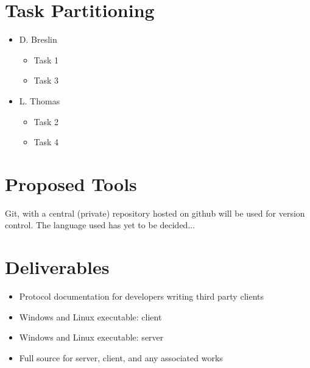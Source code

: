 \chapter{Task Partitioning}
\begin{itemize}
\item D. Breslin
    \begin{itemize}
    \item Task 1
    \item Task 3
    \end{itemize}
\item L. Thomas
    \begin{itemize}
    \item Task 2
    \item Task 4
    \end{itemize}
\end{itemize}

\chapter{Proposed Tools}
Git, with a central (private) repository hosted on github will be used for
version control. The language used has yet to be decided...

\chapter{Deliverables}
\begin{itemize}
\item Protocol documentation for developers writing third party clients
\item Windows and Linux executable: client
\item Windows and Linux executable: server
\item Full source for server, client, and any associated works
\end{itemize}
